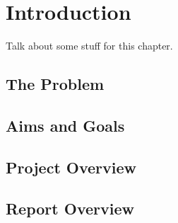 \chapter{Introduction}
Talk about some stuff for this chapter.

\newpage


\section{The Problem}

\section{Aims and Goals}

\section{Project Overview}

\section{Report Overview}
